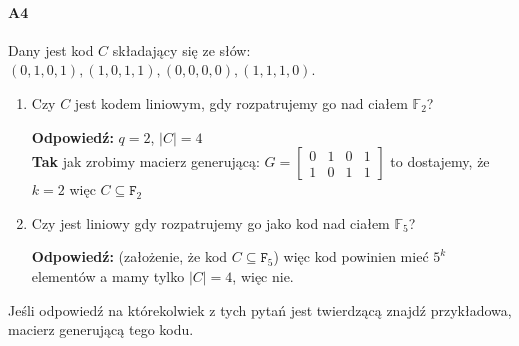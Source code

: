 \documentclass[a4paper,12pt]{article}
\theoremstyle{definition}%
\theoremstyle{definition}
\theoremstyle{problem}
\begin{document}
\paragraph{A4} Dany jest kod $C$ składający się ze słów: $(0, 1, 0, 1), (1, 0, 1, 1), (0, 0, 0, 0), (1, 1, 1, 0)$.
\begin{enumerate}[label=\alph*)]
\item Czy $C$ jest kodem liniowym, gdy rozpatrujemy go nad ciałem $\mathbb{F}_2$?

\textbf{Odpowiedź: }$q=2$, $|C|=4$\\
\textbf{Tak} jak zrobimy macierz generującą: $G=\begin{bmatrix}
0&1&0&1\\1&0&1&1
\end{bmatrix}$ to dostajemy, że  $k=2$ więc $C\subseteq \mathtt{F}_2$
\item Czy jest liniowy gdy rozpatrujemy go jako kod nad ciałem $\mathbb{F}_5$?

\textbf{Odpowiedź: }(założenie, że kod $C\subseteq \mathtt{F}_5$) więc kod powinien mieć $5^k$ elementów a mamy tylko $|C|=4$, więc nie.
\end{enumerate}
Jeśli odpowiedź na którekolwiek z tych pytań jest twierdzącą znajdź przykładowa, macierz generującą tego kodu.
\end{document}
